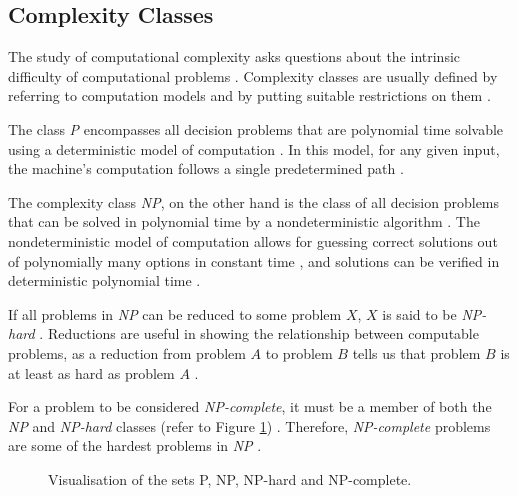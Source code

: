 \documentclass[a4paper, 12pt]{extreport}
\begin{document}
			\subsection{Complexity Classes}\label{subsec:compclass}
				
				The study of computational complexity asks questions about the intrinsic difficulty of computational problems \cite{cc:conceptual-perspective}. Complexity classes are usually defined by referring to computation models and by putting suitable restrictions on them \cite{uniform-cc}. 
				
				The class \textit{P} encompasses all decision problems that are polynomial time solvable using a deterministic model of computation \cite{cc:modern}. In this model, for any given input, the machine's computation follows a single predetermined path \cite{sipser-intro-to-computation}. 
				
				The complexity class \textit{NP}, on the other hand is the class of all decision problems that can be solved in polynomial time by a nondeterministic algorithm \cite{computers-and-intractability}. The nondeterministic model of computation allows for guessing correct solutions out of polynomially many options in constant time \cite{npcompleteness}, and solutions can be verified in deterministic polynomial time \cite{sipser-intro-to-computation}.
				
				If all problems in \textit{NP} can be reduced to some problem $X$, $X$ is said to be \textit{NP-hard} \cite{sipser-intro-to-computation}. Reductions are useful in showing the relationship between computable problems, as a reduction from problem $A$ to problem $B$ tells us that problem $B$ is at least as hard as problem $A$ \cite{npcompleteness}.
				
				For a problem to be considered \textit{NP-complete}, it must be a member of both the \textit{NP} and \textit{NP-hard} classes (refer to Figure \ref{fig:p,np,npcomplete}) \cite{npcompleteness}. Therefore, \textit{NP-complete} problems are some of the hardest problems in \textit{NP} \cite{cc:modern}.
				
				\begin{figure}
					\centering
					\begin{adjustbox}{max width=\linewidth}
					\end{adjustbox}
					\caption{\centering Visualisation of the sets P, NP, NP-hard and NP-complete.}
					\label{fig:p,np,npcomplete}
				\end{figure}
				
\end{document}
